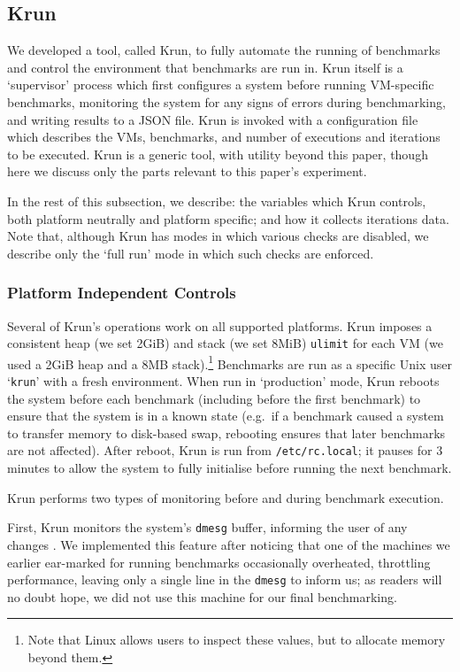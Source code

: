 \documentclass[10pt,preprint]{sigplanconf}
\newcommand{\krun}{Krun\xspace}
\begin{document}
\subsection{\krun}

We developed a tool, called \krun, to fully automate the running of benchmarks
and control the environment that benchmarks are run in. \krun itself is a
`supervisor' process which first configures a system before running VM-specific
benchmarks, monitoring the system for any signs of errors during benchmarking,
and writing results to a JSON file. \krun is invoked with a configuration file
which describes the VMs, benchmarks, and number of executions and iterations to
be executed. \krun is a generic tool, with utility beyond this paper, though
here we discuss only the parts relevant to this paper's experiment. 

In the rest
of this subsection, we describe: the variables which \krun controls, both
platform neutrally and platform specific; and how it collects iterations data.
Note that, although \krun has modes in which various checks are disabled, we
describe only the `full run' mode in which such checks are enforced.


\subsubsection{Platform Independent Controls}

Several of \krun's operations work on all supported platforms. \krun imposes a
consistent heap (we set 2GiB) and stack (we set 8MiB) \texttt{ulimit} for each
VM (we used a 2GiB heap and a 8MB stack).\footnote{Note that Linux allows users
to inspect these values, but to allocate memory beyond them.} Benchmarks are run
as a specific Unix user `\texttt{krun}' with a fresh environment. When run in
`production' mode, \krun reboots the system before each benchmark (including
before the first benchmark) to ensure that the system is in a known state
(e.g.~if a benchmark caused a system to transfer memory to disk-based swap,
rebooting ensures that later benchmarks are not affected). After reboot, \krun
is run from \texttt{/etc/rc.local}; it pauses for 3 minutes to allow the system
to fully initialise before running the next benchmark.

\krun performs two types of monitoring before and during benchmark execution.

First, \krun monitors the system's \texttt{dmesg} buffer, informing the user of
any changes . We implemented this feature after noticing that one of the machines we
earlier ear-marked for running benchmarks occasionally overheated, throttling
performance, leaving only a single line in the \texttt{dmesg} to inform us; as
readers will no doubt hope, we did not use this machine for our final
benchmarking.
\end{document}
